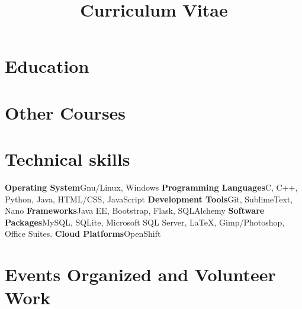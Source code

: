 \documentclass[11pt,a4paper,sans]{moderncv} %
\title{Curriculum Vitae}
\begin{document}
\makecvtitle %


\section{Education}






\section{Other Courses}




\section{Technical skills}

\cvcomputer
{\textbf{Operating System}}{Gnu/Linux, Windows}
{\textbf{Programming Languages}}{C, C++, Python, Java, HTML/CSS, JavaScript}
\cvcomputer
{\textbf{Development Tools}}{Git, SublimeText, Nano}
{\textbf{Frameworks}}{Java EE, Bootstrap, Flask, SQLAlchemy}
\cvcomputer
{\textbf{Software Packages}}{MySQL, SQLite, Microsoft SQL Server, \LaTeX, Gimp/Photoshop, Office Suites.}
{\textbf{Cloud Platforms}}{OpenShift}
{}{}


\section{Events Organized and Volunteer Work}
\end{document}
